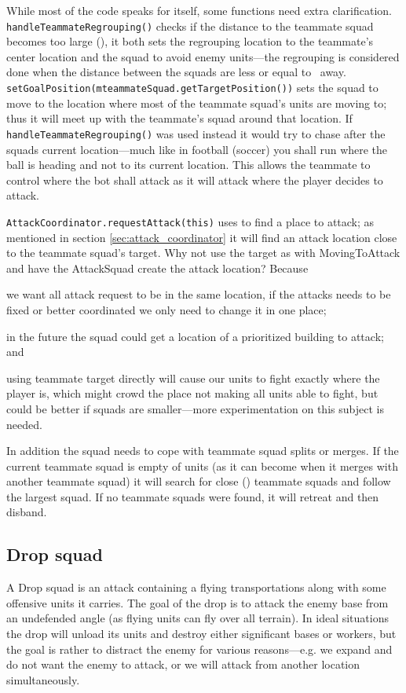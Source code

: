 While most of the code speaks for itself, some functions need extra clarification.
\texttt{handleTeammateRegrouping()} checks if the distance to the teammate squad becomes too large
(\squadAttackAlliedRegroupBegin), it both sets the regrouping location to the teammate's center
location and the squad to avoid enemy units—the regrouping is considered done when the distance
between the squads are less or equal to \squadAttackAlliedRegroupEnd~away.
\texttt{setGoalPosition(mteammateSquad.getTargetPosition())} sets the squad to move to the location
where most of the teammate squad's units are moving to; thus it will meet up with the teammate's
squad around that location. If \texttt{handleTeammateRegrouping()} was used instead it would try to chase after the
squads current location—much like in football (soccer) you shall run where the ball is heading and
not to its current location. This allows the teammate to control where the bot shall attack
as it will attack where the player decides to attack.

\texttt{AttackCoordinator.requestAttack(this)} uses  to find a
place to attack; as mentioned in section \ref{sec:attack_coordinator} it will find an attack
location close to the teammate squad's target. Why not use the target as with MovingToAttack and
have the AttackSquad create the attack location? Because
\begin{inparaenum}[1\upshape)]
	\item we want all attack request to be in the same location, if the attacks needs to be fixed or
		better coordinated we only need to change it in one place;
	\item in the future the squad could get a location of a prioritized building to attack; and
	\item using teammate target directly will cause our units to fight exactly where the player is,
		which might crowd the place not making all units able to fight, but could be better if squads
		are smaller—more experimentation on this subject is needed.
\end{inparaenum}

In addition the squad needs to cope with teammate squad splits or merges. If the current teammate
squad is empty of units (as it can become when it merges with another teammate squad) it will search
for close (\squadAttackFindAlliedSquadDistance) teammate squads and follow the largest squad. If no
teammate squads were found, it will retreat and then disband.

\subsection{Drop squad}
\label{sec:drop_squad}
A Drop squad is an attack containing a flying transportations along with some offensive units it
carries. The goal of the drop is to attack the enemy base from an undefended angle (as flying units
can fly over all terrain). In ideal situations the drop will unload its units and destroy either
significant bases or workers, but the goal is rather to distract the enemy for various reasons—e.g.
we expand and do not want the enemy to attack, or we will attack from another location
simultaneously.

